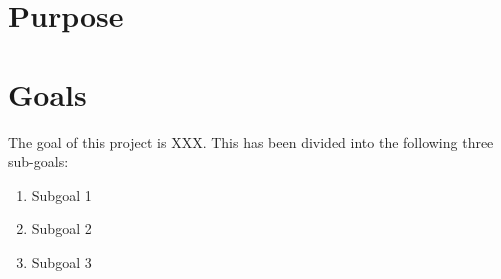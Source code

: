 
\section{Purpose}



\section{Goals}



The goal of this project is XXX. This has been divided into the following three sub-goals:
\begin{enumerate}
\item Subgoal 1 %
\item Subgoal 2 %
\item Subgoal 3 %
\end{enumerate}

